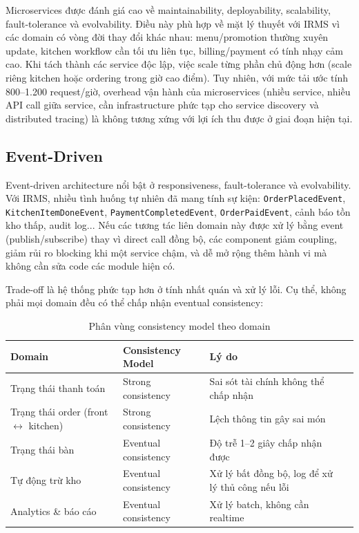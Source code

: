 Microservices được đánh giá cao về maintainability, deployability, scalability, fault-tolerance và evolvability. Điều này phù hợp về mặt lý thuyết với IRMS vì các domain có vòng đời thay đổi khác nhau: menu/promotion thường xuyên update, kitchen workflow cần tối ưu liên tục, billing/payment có tính nhạy cảm cao. Khi tách thành các service độc lập, việc scale từng phần chủ động hơn (scale riêng kitchen hoặc ordering trong giờ cao điểm). Tuy nhiên, với mức tải ước tính 800--1.200 request/giờ, overhead vận hành của microservices (nhiều service, nhiều API call giữa service, cần infrastructure phức tạp cho service discovery và distributed tracing) là không tương xứng với lợi ích thu được ở giai đoạn hiện tại.
 
\subsection{Event-Driven}
 
Event-driven architecture nổi bật ở responsiveness, fault-tolerance và evolvability. Với IRMS, nhiều tình huống tự nhiên đã mang tính sự kiện: \texttt{OrderPlacedEvent}, \texttt{KitchenItemDoneEvent}, \texttt{PaymentCompletedEvent}, \texttt{OrderPaidEvent}, cảnh báo tồn kho thấp, audit log... Nếu các tương tác liên domain này được xử lý bằng event (publish/subscribe) thay vì direct call đồng bộ, các component giảm coupling, giảm rủi ro blocking khi một service chậm, và dễ mở rộng thêm hành vi mà không cần sửa code các module hiện có.
 
Trade-off là hệ thống phức tạp hơn ở tính nhất quán và xử lý lỗi. Cụ thể, không phải mọi domain đều có thể chấp nhận eventual consistency:
 
\begin{table}[h!]
\centering
\caption{Phân vùng consistency model theo domain}
\begin{tabular}{|l|l|p{6.5cm}|l|}
\hline
\textbf{Domain} & \textbf{Consistency Model} & \textbf{Lý do} \\
\hline
Trạng thái thanh toán & Strong consistency & Sai sót tài chính không thể chấp nhận \\
\hline
Trạng thái order (front $\leftrightarrow$ kitchen) & Strong consistency & Lệch thông tin gây sai món \\
\hline
Trạng thái bàn & Eventual consistency & Độ trễ 1--2 giây chấp nhận được \\
\hline
Tự động trừ kho & Eventual consistency & Xử lý bất đồng bộ, log để xử lý thủ công nếu lỗi \\
\hline
Analytics \& báo cáo & Eventual consistency & Xử lý batch, không cần realtime \\
\hline
\end{tabular}
\end{table}
 
